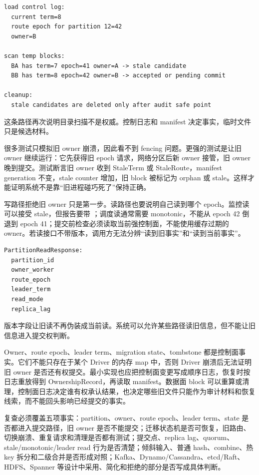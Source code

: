 \begin{lstlisting}[numbers=none,caption={恢复分类}]
load control log:
  current term=8
  route epoch for partition 12=42
  owner=B

scan temp blocks:
  BA has term=7 epoch=41 owner=A -> stale candidate
  BB has term=8 epoch=42 owner=B -> accepted or pending commit

cleanup:
  stale candidates are deleted only after audit safe point
\end{lstlisting}

这条路径再次说明目录扫描不是权威。控制日志和 manifest 决定事实，临时文件只是候选材料。

很多测试只模拟旧 owner 崩溃，因此看不到 fencing 问题。更强的测试是让旧 owner 继续运行：它先获得旧 epoch 请求，网络分区后新 owner 接管，旧 owner 晚到提交。测试断言旧 owner 收到 StaleTerm 或 StaleRoute，manifest generation 不变，stale counter 增加，旧 block 被标记为 orphan 或 stale。这样才能证明系统不是靠“旧进程碰巧死了”保持正确。

写路径拒绝旧 owner 只是第一步。读路径也要说明自己读到哪个 epoch。监控读可以接受 stale，但报告要带 ；调度读通常需要 monotonic，不能从 epoch 42 倒退到 epoch 41；提交前检查必须读取当前强控制面，不能使用缓存过期的 owner。若读接口不带版本，调用方无法分辨“读到旧事实”和“读到当前事实”。

\begin{lstlisting}[numbers=none,caption={读响应携带版本}]
PartitionReadResponse:
  partition_id
  owner_worker
  route_epoch
  leader_term
  read_mode
  replica_lag
\end{lstlisting}

版本字段让旧读不再伪装成当前读。系统可以允许某些路径读旧信息，但不能让旧信息进入提交权判断。

Owner、route epoch、leader term、migration state、tombstone 都是控制面事实。它们不能只存在于某个 Driver 的内存 map 中，否则 Driver 崩溃后无法证明旧 owner 是否还有权提交。最小实现也应把控制面变更写成顺序日志，恢复时按日志重放得到 OwnershipRecord，再读取 manifest。数据面 block 可以重算或清理，控制面日志决定谁有权承认结果，也决定哪些旧文件只能作为审计材料和恢复线索，而不能回头影响已经提交的事实。

复查必须覆盖五项事实：partition、owner、route epoch、leader term、state 是否都进入提交路径，旧 owner 是否不能提交；迁移状态机是否可恢复，旧路由、切换崩溃、重复请求和清理是否都有测试；提交点、replica lag、quorum、stale/monotonic/leader read 行为是否清楚；倾斜输入、普通 hash、combine、热 key 拆分和二级合并是否形成对照；Kafka、Dynamo/Cassandra、etcd/Raft、HDFS、Spanner 等设计中采用、简化和拒绝的部分是否写成具体判断。

